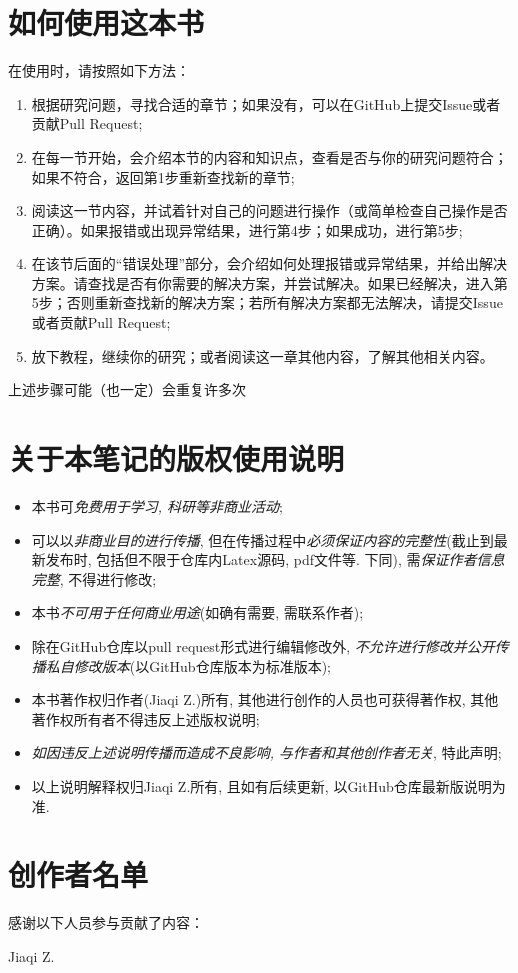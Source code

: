 \section*{如何使用这本书}

在使用时，请按照如下方法：

\begin{enumerate}
    \item 根据研究问题，寻找合适的章节；如果没有，可以在GitHub上提交Issue或者贡献Pull Request;
    \item 在每一节开始，会介绍本节的内容和知识点，查看是否与你的研究问题符合；如果不符合，返回第1步重新查找新的章节;
    \item 阅读这一节内容，并试着针对自己的问题进行操作（或简单检查自己操作是否正确）。如果报错或出现异常结果，进行第4步；如果成功，进行第5步;
    \item 在该节后面的“错误处理”部分，会介绍如何处理报错或异常结果，并给出解决方案。请查找是否有你需要的解决方案，并尝试解决。如果已经解决，进入第5步；否则重新查找新的解决方案；若所有解决方案都无法解决，请提交Issue或者贡献Pull Request;
    \item 放下教程，继续你的研究；或者阅读这一章其他内容，了解其他相关内容。
\end{enumerate}

上述步骤可能（也一定）会重复许多次

\section*{关于本笔记的版权使用说明}

\begin{itemize}
    \item 本书可\emph{免费用于学习, 科研等非商业活动};
    \item 可以以\emph{非商业目的进行传播}, 但在传播过程中\emph{必须保证内容的完整性}(截止到最新发布时, 包括但不限于仓库内Latex源码, pdf文件等. 下同), 需\emph{保证作者信息完整}, 不得进行修改;
    \item 本书\emph{不可用于任何商业用途}(如确有需要, 需联系作者);
    \item 除在GitHub仓库以pull request形式进行编辑修改外, \emph{不允许进行修改并公开传播私自修改版本}(以GitHub仓库版本为标准版本);
    \item 本书著作权归作者(Jiaqi Z.)所有, 其他进行创作的人员也可获得著作权, 其他著作权所有者不得违反上述版权说明;
    \item \emph{如因违反上述说明传播而造成不良影响, 与作者和其他创作者无关}, 特此声明;
    \item 以上说明解释权归Jiaqi Z.所有, 且如有后续更新, 以GitHub仓库最新版说明为准.
\end{itemize}

\section*{创作者名单}

感谢以下人员参与贡献了内容：

Jiaqi Z.